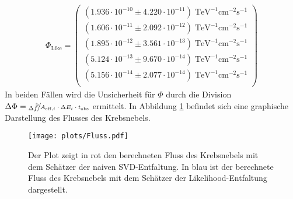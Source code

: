 \begin{align*}
	\Phi_{\text{Like}} = \begin{pmatrix}
			(1.936\cdot10^{-10}\pm 4.220\cdot10^{-11})\;\mathrm{TeV}^{-1}\mathrm{cm}^{-2}\mathrm{s}^{-1}\\
			(1.606\cdot10^{-11}\pm 2.092\cdot10^{-12})\;\mathrm{TeV}^{-1}\mathrm{cm}^{-2}\mathrm{s}^{-1}\\
			(1.895\cdot10^{-12}\pm 3.561\cdot10^{-13})\;\mathrm{TeV}^{-1}\mathrm{cm}^{-2}\mathrm{s}^{-1}\\
			(5.124\cdot10^{-13}\pm 9.670\cdot10^{-14})\;\mathrm{TeV}^{-1}\mathrm{cm}^{-2}\mathrm{s}^{-1}\\
			(5.156\cdot10^{-14}\pm 2.077\cdot10^{-14})\;\mathrm{TeV}^{-1}\mathrm{cm}^{-2}\mathrm{s}^{-1}\\
	 \end{pmatrix}
\end{align*}
In beiden Fällen wird die Unsicherheit für $\Phi$ durch die Division $\Delta \Phi = \sfrac{\Delta \hat{\vec{f}}}{A_{\text{eff},i} \cdot \Delta E_{i} \cdot t_{\text{obs}} }$ ermittelt. In Abbildung \ref{fig:Fluss} befindet sich eine graphische Darstellung des Flusses des Krebsnebels.\\
\begin{figure}
  \centering
  \texttt{[image: plots/Fluss.pdf]}
  \caption{Der Plot zeigt in rot den berechneten Fluss des Krebsnebels mit dem Schätzer der naiven SVD-Entfaltung. In blau ist der berechnete Fluss des Krebsnebels mit dem Schätzer der Likelihood-Entfaltung dargestellt.}
  \label{fig:Fluss}
\end{figure}
